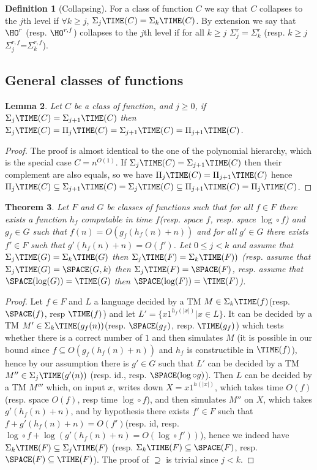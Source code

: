 \documentclass[a4paper,12pt]{article}
\newtheorem{theorem}{Theorem}[section]
\newtheorem{lemma}[theorem]{Lemma}
\theoremstyle{definition}
\newtheorem{definition}[theorem]{Definition}
\newcommand{\ATIME}[2]{\ensuremath{\Sigma_{#2}\TIME(#1)}}
\newcommand{\coATIME}[2]{\ensuremath{\Pi_{#2}\TIME(#1)}}
\newcommand{\hoa}[1]{\ensuremath{\HO^{#1}}}
\newcommand{\hob}[2]{\ensuremath{\Sigma^{#1}_{#2}}}
\newcommand{\hod}[2]{\ensuremath{\HO^{#1,#2}}}
\newcommand{\hoc}[3]{\ensuremath{\Sigma^{#1,#3}_{#2}}}
\begin{document}
\begin{definition}[Collapsing]
  For a class of function $C$ we say that $C$ collapses to the $j$th
  level if $\forall k\ge j$, $\ATIME{C}{j}=\ATIME{C}{k}$.  By extension we
  say that \hoa r (resp. \hod rf) collapses to the $j$th level if for
  all $k\ge j$ $\hob{r}{j}=\hob{r}{k}$ (resp.  $k\ge j$
  \hoc{r}{j}{f}=\hoc{r}{k}{f}).
\end{definition}
\subsection{General classes of functions}
\begin{lemma}\label{lem:alt}
  Let $C$ be a class of function, and $j\ge 0$, if
  $\ATIME{C}{j}=\ATIME{C}{j+1}$ then
  $\ATIME{C}{j}=\coATIME{C}{j}=\ATIME{C}{j+1}=\coATIME{C}{j+1}$.
\end{lemma}
\begin{proof}
  The proof is almost identical to the one of the polynomial
  hierarchy, which is the special case $C=n^{O(1)}$. If
  $\ATIME{C}{j}=\ATIME{C}{j+1}$ then their complement are also equals,
  so we have $\coATIME{C}{j}=\coATIME{C}{j+1}$ hence
  $\coATIME{C}{j}\subseteq\ATIME{C}{j+1}=\ATIME{C}{j}\subseteq\coATIME{C}{j+1}=\coATIME{C}{j}$.
\end{proof}
\begin{theorem}\label{atimehigher}
  Let $F$ and $G$ be classes of functions such that for all $f\in F$
  there exists a function $h_{f}$ computable in time $f$(resp. space
  $f$, resp. space $\log\circ f$) and $g_{f}\in G$ such that
  $f(n)=O(g_{f}(h_{f}(n)+n))$ and for all $g'\in G$ there exists
  $f'\in F$ such that $g'(h_{f}(n)+n)=O(f')$. Let $0\le j<k$ and
  assume that $\ATIME{G}{j}=\ATIME{G}{k}$ then
  $\ATIME{F}{j}=\ATIME{F}{k})$ (resp. assume that
  $\ATIME{G}{j}=\SPACE(G,k)$ then $\ATIME{F}{j}=\SPACE(F)$, resp. assume
  that $\SPACE(\log(G))=\TIME({G})$ then
  $\SPACE(\log(F))=\TIME({F})$).
\end{theorem}
\begin{proof}
  Let $f\in F$ and $L$ a language decided by a TM
  $M\in\ATIME{f}{k}$(resp. $\SPACE(f)$, resp $\TIME({f})$) and let
  $L'=\{x1^{h_{f}(|x|)}|x\in L\}$. It can be decided by a TM $M'\in
  \ATIME{g_{f}(n)}{k}$(resp. $\SPACE(g_{f})$, resp. $\TIME({g_{f}})$)
  which tests whether there is a correct number of $1$ and then
  simulates $M$ (it is possible in our bound since $f\subseteq
  O(g_{f}(h_{f}(n)+n))$ and $h_{f}$ is constructible  in
  $\TIME(f)$), hence by our assumption there is $g'\in G$ such that
  $L'$ can be decided by a TM $M''\in\ATIME{g'(n)}{j}$ (resp. id.,
  resp. $\SPACE(\log\circ g)$). Then $L$ can be decided by a TM $M'''$
  which, on input $x$, writes down $X=x1^{h(|x|)}$, which takes time
  $O(f)$ (resp. space $O(f)$, resp time $\log\circ f$), and then
  simulates $M''$ on $X$, which takes $g'(h_{f}(n)+n)$, and by
  hypothesis there exists $f'\in F$ such that
  $f+g'(h_{f}(n)+n)=O(f')$(resp. id, resp. $\log\circ
  f+\log(g'(h_{f}(n)+n)=O(\log\circ f'))$), hence we indeed have
  $\ATIME{F}{k}\subseteq\ATIME{F}{j}$
  (resp. $\ATIME{F}{k}\subseteq\SPACE(F)$,
  resp. $\SPACE(F)\subseteq\TIME(F)$). The proof of $\supseteq$ is
  trivial since $j<k$.
\end{proof}
\end{document}
